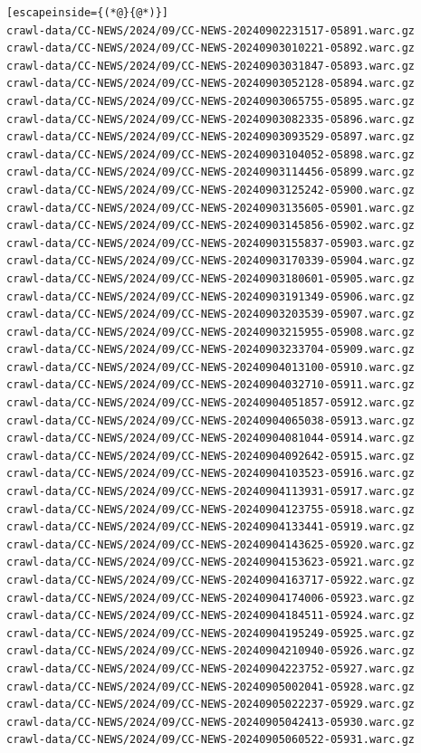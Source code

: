 \begin{lstlisting}[escapeinside={(*@}{@*)}]
crawl-data/CC-NEWS/2024/09/CC-NEWS-20240902231517-05891.warc.gz
crawl-data/CC-NEWS/2024/09/CC-NEWS-20240903010221-05892.warc.gz
crawl-data/CC-NEWS/2024/09/CC-NEWS-20240903031847-05893.warc.gz
crawl-data/CC-NEWS/2024/09/CC-NEWS-20240903052128-05894.warc.gz
crawl-data/CC-NEWS/2024/09/CC-NEWS-20240903065755-05895.warc.gz
crawl-data/CC-NEWS/2024/09/CC-NEWS-20240903082335-05896.warc.gz
crawl-data/CC-NEWS/2024/09/CC-NEWS-20240903093529-05897.warc.gz
crawl-data/CC-NEWS/2024/09/CC-NEWS-20240903104052-05898.warc.gz
crawl-data/CC-NEWS/2024/09/CC-NEWS-20240903114456-05899.warc.gz
crawl-data/CC-NEWS/2024/09/CC-NEWS-20240903125242-05900.warc.gz
crawl-data/CC-NEWS/2024/09/CC-NEWS-20240903135605-05901.warc.gz
crawl-data/CC-NEWS/2024/09/CC-NEWS-20240903145856-05902.warc.gz
crawl-data/CC-NEWS/2024/09/CC-NEWS-20240903155837-05903.warc.gz
crawl-data/CC-NEWS/2024/09/CC-NEWS-20240903170339-05904.warc.gz
crawl-data/CC-NEWS/2024/09/CC-NEWS-20240903180601-05905.warc.gz
crawl-data/CC-NEWS/2024/09/CC-NEWS-20240903191349-05906.warc.gz
crawl-data/CC-NEWS/2024/09/CC-NEWS-20240903203539-05907.warc.gz
crawl-data/CC-NEWS/2024/09/CC-NEWS-20240903215955-05908.warc.gz
crawl-data/CC-NEWS/2024/09/CC-NEWS-20240903233704-05909.warc.gz
crawl-data/CC-NEWS/2024/09/CC-NEWS-20240904013100-05910.warc.gz
crawl-data/CC-NEWS/2024/09/CC-NEWS-20240904032710-05911.warc.gz
crawl-data/CC-NEWS/2024/09/CC-NEWS-20240904051857-05912.warc.gz
crawl-data/CC-NEWS/2024/09/CC-NEWS-20240904065038-05913.warc.gz
crawl-data/CC-NEWS/2024/09/CC-NEWS-20240904081044-05914.warc.gz
crawl-data/CC-NEWS/2024/09/CC-NEWS-20240904092642-05915.warc.gz
crawl-data/CC-NEWS/2024/09/CC-NEWS-20240904103523-05916.warc.gz
crawl-data/CC-NEWS/2024/09/CC-NEWS-20240904113931-05917.warc.gz
crawl-data/CC-NEWS/2024/09/CC-NEWS-20240904123755-05918.warc.gz
crawl-data/CC-NEWS/2024/09/CC-NEWS-20240904133441-05919.warc.gz
crawl-data/CC-NEWS/2024/09/CC-NEWS-20240904143625-05920.warc.gz
crawl-data/CC-NEWS/2024/09/CC-NEWS-20240904153623-05921.warc.gz
crawl-data/CC-NEWS/2024/09/CC-NEWS-20240904163717-05922.warc.gz
crawl-data/CC-NEWS/2024/09/CC-NEWS-20240904174006-05923.warc.gz
crawl-data/CC-NEWS/2024/09/CC-NEWS-20240904184511-05924.warc.gz
crawl-data/CC-NEWS/2024/09/CC-NEWS-20240904195249-05925.warc.gz
crawl-data/CC-NEWS/2024/09/CC-NEWS-20240904210940-05926.warc.gz
crawl-data/CC-NEWS/2024/09/CC-NEWS-20240904223752-05927.warc.gz
crawl-data/CC-NEWS/2024/09/CC-NEWS-20240905002041-05928.warc.gz
crawl-data/CC-NEWS/2024/09/CC-NEWS-20240905022237-05929.warc.gz
crawl-data/CC-NEWS/2024/09/CC-NEWS-20240905042413-05930.warc.gz
crawl-data/CC-NEWS/2024/09/CC-NEWS-20240905060522-05931.warc.gz

\end{lstlisting}
